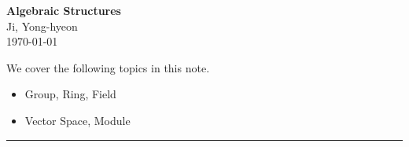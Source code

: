 \documentclass[11pt,openany]{article}
\begin{document}
\begin{center}
	\huge\textbf{Algebraic Structures}\\
	\vspace{0.5em}
	\large{Ji, Yong-hyeon}\\
	\vspace{0.5em}
	\normalsize{\today}\\
\end{center}

\noindent 
We cover the following topics in this note.
\begin{itemize}
	\item Group, Ring, Field
	\item Vector Space, Module
\end{itemize}
\hrule\vspace{12pt}
\end{document}
